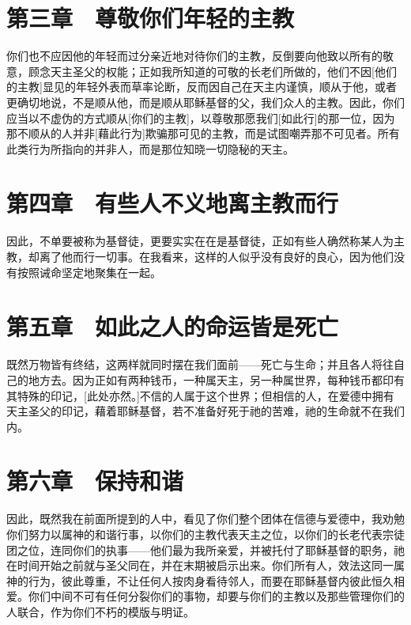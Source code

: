 \section{第三章　尊敬你们年轻的主教}

你们也不应因他的年轻而过分亲近地对待你们的主教，反倒要向他致以所有的敬意，顾念天主圣父的权能；正如我所知道的可敬的长老们所做的，他们不因[他们的主教]显见的年轻外表而草率论断，反而因自己在天主内谨慎，顺从于他，或者更确切地说，不是顺从他，而是顺从耶稣基督的父，我们众人的主教。因此，你们应当以不虚伪的方式顺从[你们的主教]，以尊敬那愿我们[如此行]的那一位，因为那不顺从的人并非[藉此行为]欺骗那可见的主教，而是试图嘲弄那不可见者。所有此类行为所指向的并非人，而是那位知晓一切隐秘的天主。\par


\section{第四章　有些人不义地离主教而行}

因此，不单要被称为基督徒，更要实实在在是基督徒，正如有些人确然称某人为主教，却离了他而行一切事。在我看来，这样的人似乎没有良好的良心，因为他们没有按照诫命坚定地聚集在一起。\par


\section{第五章　如此之人的命运皆是死亡}

既然万物皆有终结，这两样就同时摆在我们面前——死亡与生命；并且各人将往自己的地方去。因为正如有两种钱币，一种属天主，另一种属世界，每种钱币都印有其特殊的印记，[此处亦然。]不信的人属于这个世界；但相信的人，在爱德中拥有天主圣父的印记，藉着耶稣基督，若不准备好死于祂的苦难，祂的生命就不在我们内。\par


\section{第六章　保持和谐}

因此，既然我在前面所提到的人中，看见了你们整个团体在信德与爱德中，我劝勉你们努力以属神的和谐行事，以你们的主教代表天主之位，以你们的长老代表宗徒团之位，连同你们的执事——他们最为我所亲爱，并被托付了耶稣基督的职务，祂在时间开始之前就与圣父同在，并在末期被启示出来。你们所有人，效法这同一属神的行为，彼此尊重，不让任何人按肉身看待邻人，而要在耶稣基督内彼此恒久相爱。你们中间不可有任何分裂你们的事物，却要与你们的主教以及那些管理你们的人联合，作为你们不朽的模版与明证。\par

